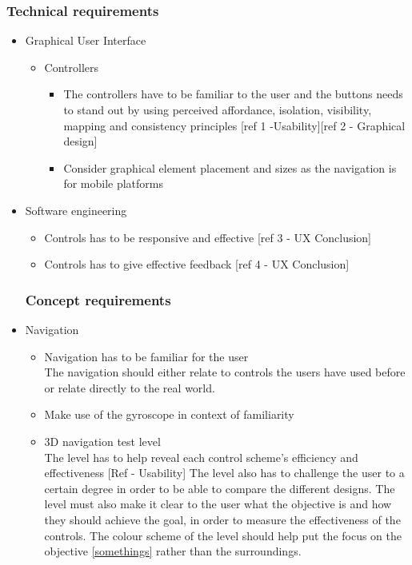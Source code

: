 \subsubsection{Technical requirements}
\begin{itemize}
	\item Graphical User Interface
		\begin{itemize}
		\item Controllers
			\begin{itemize}
				\item The controllers have to be familiar to the user and the buttons needs to stand out by using perceived affordance, isolation, visibility, mapping and consistency principles [ref 1 -Usability][ref 2 - Graphical design]
				\item Consider graphical element placement and sizes as the navigation is for mobile platforms
			\end{itemize}
		\end{itemize}
	\item Software engineering
		\begin{itemize}
			\item Controls has to be responsive and effective [ref 3 - UX Conclusion]
			\item Controls has to give effective feedback [ref 4 - UX Conclusion]
		\end{itemize}	
\subsubsection{Concept requirements}
	\item Navigation
		\begin{itemize}
		 	\item Navigation has to be familiar for the user \\
The navigation should either relate to controls the users have used before or relate directly to the real world.	
		 	\item Make use of the gyroscope in context of familiarity
		 	\item 3D navigation test level\\
The level has to help reveal each control scheme's efficiency and effectiveness [Ref - Usability]
The level also has to challenge the user to a certain 	degree in order to be able to compare the different designs. The level must also make it clear to the user what the objective is and how they should achieve the goal, in order to measure the effectiveness of the 	controls. The colour scheme of the level should help put the focus on the objective \ref {somethings} rather than the surroundings.
				\end{itemize}
\end{itemize}
